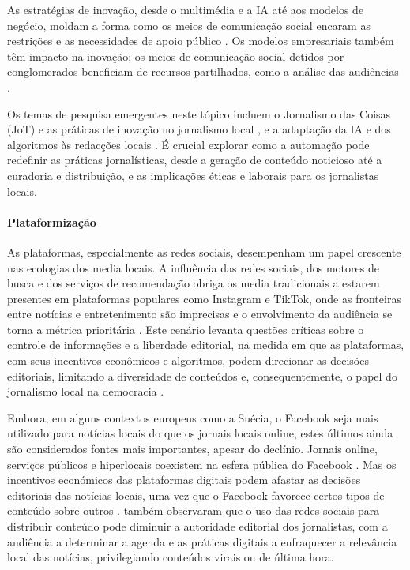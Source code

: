 \documentclass[portuguese]{textolivre}
\begin{document}
As estratégias de inovação, desde o multimédia e a IA até aos modelos de negócio, moldam a forma como os meios de comunicação social encaram as restrições e as necessidades de apoio público \cite{wilczek2021}. Os modelos empresariais também têm impacto na inovação; os meios de comunicação social detidos por conglomerados beneficiam de recursos partilhados, como a análise das audiências \cite{puijk2021}.

Os temas de pesquisa emergentes neste tópico incluem o Jornalismo das Coisas (JoT) e as práticas de inovação no jornalismo local \cite{hamm2022}, e a adaptação da IA e dos algoritmos às redacções locais \cite{dralega2023}. É crucial explorar como a automação pode redefinir as práticas jornalísticas, desde a geração de conteúdo noticioso até a curadoria e distribuição, e as implicações éticas e laborais para os jornalistas locais.


\paragraph{Plataformização}
As plataformas, especialmente as redes sociais, desempenham um papel crescente nas ecologias dos media locais. A influência das redes sociais, dos motores de busca e dos serviços de recomendação obriga os media tradicionais a estarem presentes em plataformas populares como Instagram e TikTok, onde as fronteiras entre notícias e entretenimento são imprecisas e o envolvimento da audiência se torna a métrica prioritária \cite{hradziushka2022}. Este cenário levanta questões críticas sobre o controle de informações e a liberdade editorial, na medida em que as plataformas, com seus incentivos econômicos e algoritmos, podem direcionar as decisões editoriais, limitando a diversidade de conteúdos e, consequentemente, o papel do jornalismo local na democracia \cite{fuchs2014social}.

Embora, em alguns contextos europeus como a Suécia, o Facebook seja mais utilizado para notícias locais do que os jornais locais online, estes últimos ainda são considerados fontes mais importantes, apesar do declínio. Jornais online, serviços públicos e hiperlocais coexistem na esfera pública do Facebook \cite{nygren2019}. Mas os incentivos económicos das plataformas digitais podem afastar as decisões editoriais das notícias locais, uma vez que o Facebook favorece certos tipos de conteúdo sobre outros \cite{toff2021}. \textcite{firmstone2021} também observaram que o uso das redes sociais para distribuir conteúdo pode diminuir a autoridade editorial dos jornalistas, com a audiência a determinar a agenda e as práticas digitais a enfraquecer a relevância local das notícias, privilegiando conteúdos virais ou de última hora.
\end{document}
